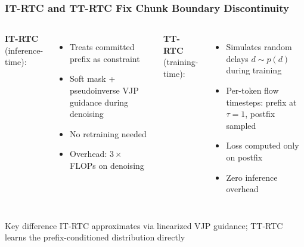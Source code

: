 \documentclass[aspectratio=1610]{beamer}
\begin{document}
\begin{frame}
\frametitle{IT-RTC and TT-RTC Fix Chunk Boundary Discontinuity}

\begin{columns}
\textbf{IT-RTC} (inference-time):
\begin{itemize}
    \item Treats committed prefix as constraint
    \item Soft mask + pseudoinverse VJP guidance during denoising
    \item \alert{No retraining needed}
    \item Overhead: $3\times$ FLOPs on denoising
\end{itemize}

\textbf{TT-RTC} (training-time):
\begin{itemize}
    \item Simulates random delays $d \sim p(d)$ during training
    \item Per-token flow timesteps: prefix at $\tau{=}1$, postfix sampled
    \item Loss computed only on postfix
    \item \alert{Zero inference overhead}
\end{itemize}
\end{columns}

\vspace{0.5em}
\begin{block}{Key difference}
IT-RTC approximates via linearized VJP guidance; TT-RTC learns the prefix-conditioned distribution directly
\end{block}

\end{frame}
\end{document}
